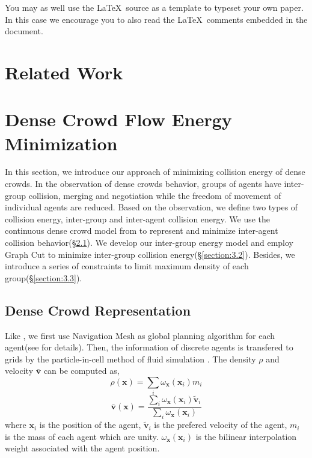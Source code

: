 You may as well use the \LaTeX\ source as a template to typeset your own
paper. In this case we encourage you to also read the \LaTeX\ comments
embedded in the document.

\section{Related Work}

\section{Dense Crowd Flow Energy Minimization}

In this section, we introduce our approach of minimizing collision energy of dense crowds. In the observation of dense crowds behavior, groups of agents have inter-group collision, merging and negotiation while the freedom of movement of individual agents are reduced\cite{Treuille:2006,Narain:2009,Golas:2013}. Based on the observation, we define two types of collision energy, inter-group and inter-agent collision energy. We use the continuous dense crowd model from \cite{Narain:2009} to represent and minimize inter-agent collision behavior(\S\ref{section:3.1}). We develop our inter-group energy model and employ Graph Cut to minimize inter-group collision energy(\S\ref{section:3.2}). Besides, we introduce a series of constraints to limit maximum density of each group(\S\ref{section:3.3}). 

\subsection{Dense Crowd Representation}
\label{section:3.1}
Like \cite{Narain:2009}, we first use Navigation Mesh as global planning algorithm for each agent(see for details). Then, the information of discrete agents is transfered to grids by the particle-in-cell method of fluid simulation \cite{Narain:2009}. The density $\rho$ and velocity $\bar{\textbf{v}}$ can be computed as,
\begin{equation}
\label{eq:1}
 \rho(\textbf{x}) = \sum_{i} \omega_\textbf{x}(\textbf{x}_i)m_i
\end{equation}
\begin{equation}
\label{eq:2}
 \bar{\textbf{v}}(\textbf{x}) = \frac{\sum_{i} \omega_\textbf{x}(\textbf{x}_i)\tilde{\textbf{v}}_i}{\sum_{i} \omega_\textbf{x}(\textbf{x}_i)}
\end{equation} 
where $\textbf{x}_i$ is the position of the agent, $\tilde{\textbf{v}}_i$ is the prefered velocity of the agent, $m_i$ is the mass of each agent which are unity. $\omega_\textbf{x}(\textbf{x}_i)$ is the bilinear interpolation weight associated with the agent position.


